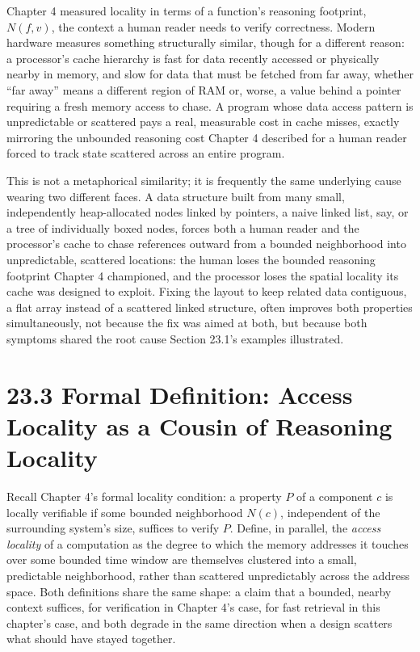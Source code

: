 \documentclass[11pt]{book}
\begin{document}
Chapter 4 measured locality in terms of a function's reasoning footprint, $N(f, v)$, the context a human reader needs to verify correctness. Modern hardware measures something structurally similar, though for a different reason: a processor's cache hierarchy is fast for data recently accessed or physically nearby in memory, and slow for data that must be fetched from far away, whether ``far away'' means a different region of RAM or, worse, a value behind a pointer requiring a fresh memory access to chase. A program whose data access pattern is unpredictable or scattered pays a real, measurable cost in cache misses, exactly mirroring the unbounded reasoning cost Chapter 4 described for a human reader forced to track state scattered across an entire program.

This is not a metaphorical similarity; it is frequently the same underlying cause wearing two different faces. A data structure built from many small, independently heap-allocated nodes linked by pointers, a naive linked list, say, or a tree of individually boxed nodes, forces both a human reader and the processor's cache to chase references outward from a bounded neighborhood into unpredictable, scattered locations: the human loses the bounded reasoning footprint Chapter 4 championed, and the processor loses the spatial locality its cache was designed to exploit. Fixing the layout to keep related data contiguous, a flat array instead of a scattered linked structure, often improves both properties simultaneously, not because the fix was aimed at both, but because both symptoms shared the root cause Section 23.1's examples illustrated.

\section*{23.3 Formal Definition: Access Locality as a Cousin of Reasoning Locality}

Recall Chapter 4's formal locality condition: a property $P$ of a component $c$ is locally verifiable if some bounded neighborhood $N(c)$, independent of the surrounding system's size, suffices to verify $P$. Define, in parallel, the \emph{access locality} of a computation as the degree to which the memory addresses it touches over some bounded time window are themselves clustered into a small, predictable neighborhood, rather than scattered unpredictably across the address space. Both definitions share the same shape: a claim that a bounded, nearby context suffices, for verification in Chapter 4's case, for fast retrieval in this chapter's case, and both degrade in the same direction when a design scatters what should have stayed together.
\end{document}
